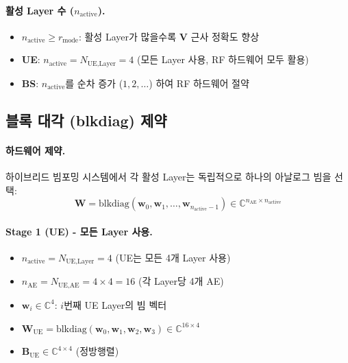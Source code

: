 \documentclass[10pt]{article}
\begin{document}
\paragraph{활성 Layer 수 ($n_{\text{active}}$).}
\begin{itemize}
    \item $n_{\text{active}} \geq r_{\text{mode}}$: 활성 Layer가 많을수록 $\mathbf{V}$ 근사 정확도 향상
    \item \textbf{UE}: $n_{\text{active}} = N_{\text{UE,Layer}} = 4$ (모든 Layer 사용, RF 하드웨어 모두 활용)
    \item \textbf{BS}: $n_{\text{active}}$를 순차 증가 ($1, 2, \ldots$) 하여 RF 하드웨어 절약
\end{itemize}

\subsection{블록 대각 (blkdiag) 제약}

\paragraph{하드웨어 제약.}
하이브리드 빔포밍 시스템에서 각 활성 Layer는 독립적으로 하나의 아날로그 빔을 선택:
\begin{equation}
\mathbf{W} = \text{blkdiag}(\mathbf{w}_0, \mathbf{w}_1, \ldots, \mathbf{w}_{n_{\text{active}}-1}) \in \mathbb{C}^{n_{\text{AE}} \times n_{\text{active}}}
\end{equation}

\paragraph{Stage 1 (UE) - 모든 Layer 사용.}
\begin{itemize}
    \item $n_{\text{active}} = N_{\text{UE,Layer}} = 4$ (UE는 모든 4개 Layer 사용)
    \item $n_{\text{AE}} = N_{\text{UE,AE}} = 4 \times 4 = 16$ (각 Layer당 4개 AE)
    \item $\mathbf{w}_i \in \mathbb{C}^{4}$: $i$번째 UE Layer의 빔 벡터
    \item $\mathbf{W}_{\text{UE}} = \text{blkdiag}(\mathbf{w}_0, \mathbf{w}_1, \mathbf{w}_2, \mathbf{w}_3) \in \mathbb{C}^{16 \times 4}$
    \item $\mathbf{B}_{\text{UE}} \in \mathbb{C}^{4 \times 4}$ (정방행렬)
\end{itemize}
\end{document}

